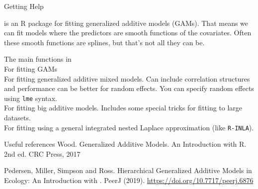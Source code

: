 
\begin{block}{Getting Help}
  
\mgcv is an R package for fitting generalized additive models (GAMs). That means we can fit models where the predictors are smooth functions of the covariates. Often these smooth functions are splines, but that's not all they can be.\br
\end{block}

\begin{block}{The main functions in \mgcv}
  \\For fitting GAMs\br
  \\For fitting generalized additive mixed models. Can include correlation structures and performance can be better for random effects. You can specify random effects using \texttt{lme} syntax.\br
  \\For fitting big additive models. Includes some special tricks for fitting to large datasets.\br
  \\For fitting using a general integrated nested Laplace approximation (like \texttt{R-INLA}).
\end{block}

\begin{block}{Useful references}
Wood. Generalized Additive Models. An Introduction with R. 2nd ed. CRC Press, 2017 \br

Pedersen, Miller, Simpson and Ross. Hierarchical Generalized Additive Models in Ecology: An Introduction with \mgcv. PeerJ (2019). \url{https://doi.org/10.7717/peerj.6876}

\end{block}
